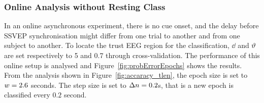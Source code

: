 
\subsubsection{Online Analysis without Resting Class}

In an online asynchronous experiment, there is no cue onset, and the delay before SSVEP synchronisation might differ from one trial to another and from one subject to another. 
To locate the trust EEG region for the classification, $\dd$ and $\vartheta$ are set respectively to 5 and 0.7 through cross-validation. 
The performance of this online setup is analysed and Figure~\ref{fig:probErrorEpochs} shows the results. 
From the analysis shown in Figure~\ref{fig:accaracy_tlen}, the epoch size is set to $w = 2.6 $ seconds.
The step size is set to $\Delta n = 0.2$s, that is a new epoch is classified every $0.2$ second.

